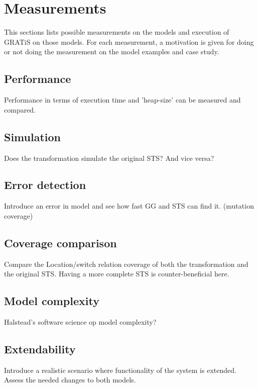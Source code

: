 \section{Measurements}\label{sec:measurements}

This sections lists possible measurements on the models and execution of GRATiS on those models. For each measurement, a motivation is given for doing or not doing the measurement on the model examples and case study.

\subsection{Performance}
Performance in terms of execution time and 'heap-size' can be measured and compared.

\subsection{Simulation}
Does the transformation simulate the original STS? And vice versa?

\subsection{Error detection}
Introduce an error in model and see how fast GG and STS can find it. (mutation coverage)

\subsection{Coverage comparison}
Compare the Location/switch relation coverage of both the transformation and the original STS. Having a more complete STS is counter-beneficial here.

\subsection{Model complexity}
Halstead's software science op model complexity?

\subsection{Extendability}
Introduce a realistic scenario where functionality of the system is extended. Assess the needed changes to both models.
